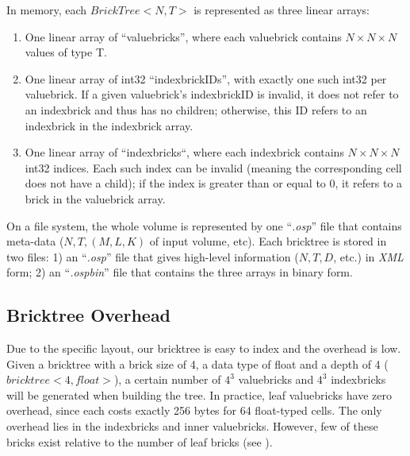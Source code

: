 

In memory, each $BrickTree<N,T>$ is represented as three linear arrays:
\begin{enumerate}
\item One linear array of ``valuebricks'', where each valuebrick contains
$N \times N \times N$ values of type T.
\item One linear array of int32 ``indexbrickIDs'', with exactly one such
int32 per valuebrick. If a given valuebrick's indexbrickID is
invalid, it does not refer to an indexbrick and thus has no children;
otherwise, this ID refers to an indexbrick in the indexbrick array.
\item One linear array of ``indexbricks``, where each indexbrick contains
$N \times N \times N$ int32 indices. Each such index can be invalid (meaning the
corresponding cell does not have a child); 
if the index is greater than or equal to 0, it refers to a brick in the valuebrick array.
\end{enumerate}

On a file system, the whole volume is represented by one ``\textit{.osp}'' file
that contains meta-data ($N,T, (M,L,K)$ of input volume, etc). 
Each bricktree is stored in two files: 1) an ``\textit{.osp}'' file that
gives high-level information ($N, T, D$, etc.) in \textit{XML} form; 
2) an ``\textit{.ospbin}'' file that contains the three arrays in binary form.


\subsection{Bricktree Overhead}
Due to the specific layout, our bricktree is easy to index and the overhead is low. 
Given a bricktree with a brick size of 4, a data type of float and a depth of 4 ($bricktree<4,float>$), a certain number of $4^3$ valuebricks and $4^3$ indexbricks will be generated when building the tree.
In practice, leaf valuebricks have zero overhead, since each costs 
exactly 256 bytes for 64 float-typed cells. The only overhead lies in the 
indexbricks and inner valuebricks. However, few of these bricks exist relative
to the number of leaf bricks (see  ).


